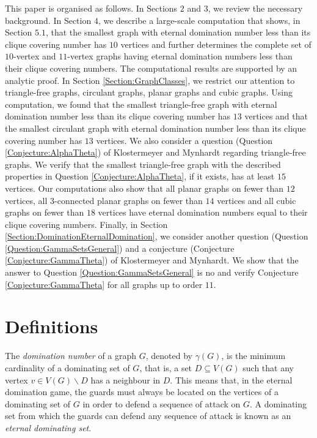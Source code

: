 \documentclass[11pt]{article}
\begin{document}
This paper is organised as follows. In Sections $2$ and $3$, we review the necessary background. In Section $4$, we describe a large-scale computation that shows, in Section $5.1$, that the smallest graph with eternal domination number less than its clique covering number has $10$ vertices and further determines the complete set of $10$-vertex and $11$-vertex graphs having eternal domination numbers less than their clique covering numbers. The computational results are supported by an analytic proof. In Section \ref{Section:GraphClasses}, we restrict our attention to triangle-free graphs, circulant graphs, planar graphs and cubic graphs. Using computation, we found that the smallest triangle-free graph with eternal domination number less than its clique covering number has $13$ vertices and that the smallest circulant graph with eternal domination number less than its clique covering number has $13$ vertices. We also consider a question (Question \ref{Conjecture:AlphaTheta}) of Klostermeyer and Mynhardt regarding triangle-free graphs. We verify that the smallest triangle-free graph with the described properties in Question \ref{Conjecture:AlphaTheta}, if it exists, has at least $15$ vertices. Our computations also show that all planar graphs on fewer than $12$ vertices, all $3$-connected planar graphs on fewer than $14$ vertices and all cubic graphs on fewer than $18$ vertices have eternal domination numbers equal to their clique covering numbers. Finally, in Section \ref{Section:DominationEternalDomination}, we consider another question (Question \ref{Question:GammaSetsGeneral}) and a conjecture (Conjecture \ref{Conjecture:GammaTheta}) of Klostermeyer and Mynhardt. We show that the answer to Question \ref{Question:GammaSetsGeneral} is no and verify Conjecture \ref{Conjecture:GammaTheta} for all graphs up to order $11$.


\section{Definitions}
The \emph{domination number} of a graph $G$, denoted by $\gamma(G)$, is the minimum cardinality of a dominating set of $G$, that is, a set $D \subseteq V(G)$ such that any vertex $v \in V(G) \backslash D$ has a neighbour in $D$. This means that, in the eternal domination game, the guards must always be located on the vertices of a dominating set of $G$ in order to defend a sequence of attack on $G$. A dominating set from which the guards can defend any sequence of attack is known as an \textit{eternal dominating set}.
\end{document}
